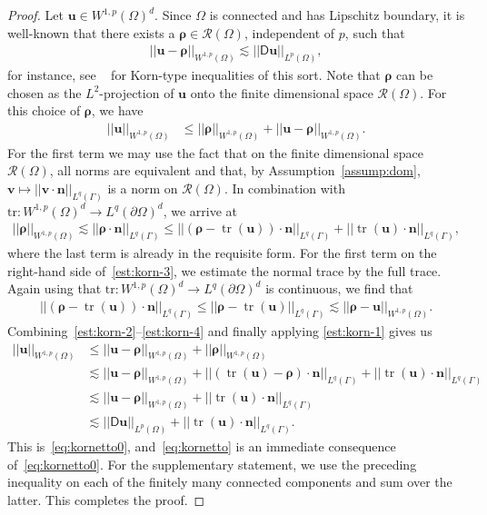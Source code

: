 \documentclass[reqno,a4paper]{amsart}
\def\norm#1{\left|\!\left| #1 \right|\!\right|}
\def\tens#1{\pmb{\mathsf{#1}}}
\def\vec#1{\boldsymbol{#1}}
\def\tr{\mathop{\mathrm{tr}}\nolimits}
\def\bn{\vec{n}}
\def\bu{\vec{u}}
\def\bv{\vec{v}}
\def\brho{\vec{\rho}}
\def\BD{\tens{D}}
\begin{document}
	\begin{proof}
		Let $\bu \in W^{1,p}(\Omega)^{d}$. 
		Since $\Omega$ is connected and has Lipschitz boundary, it is well-known that there exists a $\brho \in \mathcal{R}(\Omega)$, independent of $p$, such that 
		\begin{align}\label{est:korn-1}
			\norm{\bu - \brho}_{W^{1,p}(\Omega)} \lesssim \norm{\BD \bu}_{L^p(\Omega)},
		\end{align} 
		for instance, see ~\cite{Necas1966} for Korn-type inequalities of this sort. 
		Note that $\brho$ can be chosen as the $L^2$-projection of $\bu$ onto the finite dimensional space $\mathcal{R}(\Omega)$. 
		For this choice of $\brho$, we have 
		\begin{align}\label{est:korn-2}
			\norm{\bu}_{W^{1,p}(\Omega)}
			& \leq 	\norm{\brho}_{W^{1,p}(\Omega)} + \norm{\bu - \brho}_{W^{1,p}(\Omega)}. 
		\end{align}
		For the first term we may use the fact that on the finite dimensional space $\mathcal{R}(\Omega)$, all norms are equivalent and that, by Assumption~\ref{assump:dom}, $\bv \mapsto \norm{\bv \cdot \bn}_{L^q(\Gamma)}$ is a norm on $\mathcal{R}(\Omega)$. 
		In combination with $\mathrm{tr}\colon W^{1,p}(\Omega)^{d}\to L^{q}(\partial\Omega)^{d}$, we arrive at 
		\begin{align}\label{est:korn-3}
			\norm{\brho}_{W^{1,p}(\Omega)}
			\lesssim \norm{\brho\cdot \bn}_{L^q(\Gamma)} 
			\leq \norm{(\brho - \tr(\bu)) \cdot \bn}_{L^q(\Gamma)} +  \norm{\tr(\bu) \cdot \bn}_{L^q(\Gamma)}, 
		\end{align}
		where the last term is already in the requisite form. 
		For the first term on the right-hand side of~\eqref{est:korn-3}, we estimate the normal trace by the full trace. 
		Again using that  $\mathrm{tr}\colon W^{1,p}(\Omega)^{d}\to L^{q}(\partial\Omega)^{d}$ is continuous, we find that 
		\begin{align}\label{est:korn-4}
			\norm{(\brho - \tr(\bu)) \cdot \bn}_{L^q(\Gamma)} 
			\leq  \norm{\brho - \tr(\bu)}_{L^q(\Gamma)} 
			\lesssim \norm{\brho-\bu}_{W^{1,p}(\Omega)}. 
		\end{align}
		Combining~\eqref{est:korn-2}--\eqref{est:korn-4} and finally applying \eqref{est:korn-1} gives us
		\begin{align*}
			\norm{\bu}_{W^{1,p}(\Omega)}
			& \leq 	\norm{\bu - \brho}_{W^{1,p}(\Omega)} + 	\norm{\brho}_{W^{1,p}(\Omega)}\\
			&\lesssim 	\norm{\bu - \brho}_{W^{1,p}(\Omega)} + \norm{(\tr(\bu)-\brho) \cdot \bn}_{L^q(\Gamma)} + \norm{\tr(\bu) \cdot \bn}_{L^q(\Gamma)} \\
			&\lesssim  \norm{\bu-\brho}_{W^{1,p}(\Omega)} + \norm{\tr(\bu) \cdot \bn}_{L^q(\Gamma)} \\
			&\lesssim  \norm{\BD \bu}_{L^p(\Omega)} + \norm{\tr(\bu) \cdot \bn}_{L^q(\Gamma)}.
		\end{align*}
  This is~\eqref{eq:kornetto0}, and~\eqref{eq:kornetto} is an immediate consequence of~\eqref{eq:kornetto0}. 
		For the supplementary statement, we use the preceding inequality on each of the finitely many connected components and sum over the latter. This completes the proof. 
	\end{proof}
\end{document}
